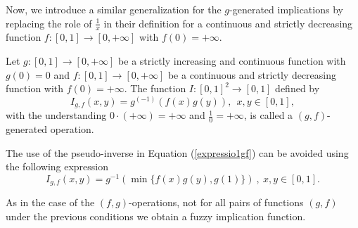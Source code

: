Now, we introduce a similar generalization for the $g$-generated implications by replacing the role of $\frac{1}{x}$ in their definition for a continuous and strictly decreasing function $f:[0,1] \to [0, + \infty]$ with $f(0)=+ \infty$.
\begin{definition}\label{def:(g,f)operations} Let $g:[0,1] \to [0, + \infty]$ be a strictly increasing and continuous function with $g(0)=0$ and $f:[0,1] \to [0, + \infty]$ be a continuous and strictly decreasing function with $f(0)= + \infty$. The function $I:[0,1]^2 \to [0,1]$ defined by
	\begin{equation}
		I_{g,f}(x,y)=g^{(-1)}(f(x)g(y)), ~~ x,y \in [0,1],
		\label{expressio1gf}
	\end{equation} 
	\noindent with the understanding $0 \cdot (+\infty) = + \infty$ and $\frac{1}{0}=+\infty$, is called a $(g,f)$-generated operation.
\end{definition}

\begin{remark} 	The use of the pseudo-inverse in Equation (\ref{expressio1gf}) can be avoided using the following expression
	\begin{equation}\label{expressio2gf}
		I_{g,f}(x,y)=g^{-1}(\min \{f(x)g(y),g(1)\}) ~,~ x,y \in [0,1].
	\end{equation}
\end{remark}
As in the case of the $(f,g)$-operations, not for all pairs of functions $(g,f)$ under the previous conditions we obtain a fuzzy implication function.

